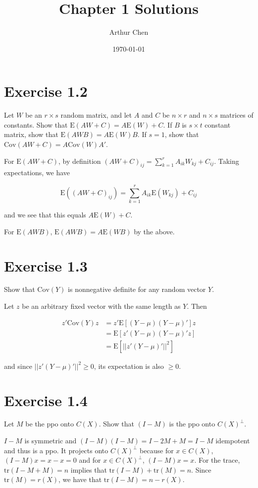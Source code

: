 \documentclass{article}
\author{Arthur Chen}
\title{Chapter 1 Solutions}
\date{\today}
\newcommand{\E}{\text{E}}
\newcommand{\cov}{\text{Cov}}
\newcommand{\tr}{\text{tr}}
\begin{document}
\maketitle

\section*{Exercise 1.2}

Let $W$ be an $r \times s$ random matrix, and let $A$ and $C$ be $n \times r$ and $n \times s$ matrices of constants. Show that $\E(AW+C) = A\E(W) + C$. If $B$ is $s \times t$ constant matrix, show that $\E(AWB) = A\E(W)B$. If $s=1$, show that $\cov(AW+C) = A\cov(W)A'$.

For $\E(AW+C)$, by definition $(AW+C)_{ij} = \sum_{k=1}^r A_{ik}W_{kj} + C_{ij}$. Taking expectations, we have

\[
\E((AW+C)_{ij}) = \sum_{k=1}^r A_{ik}\E(W_{kj}) + C_{ij}
\]

and we see that this equals $A\E(W)+C$.

For $\E(AWB)$, $\E(AWB) = A\E(WB)$ by the above.

\section*{Exercise 1.3}

Show that $\cov(Y)$ is nonnegative definite for any random vector $Y$.

Let $z$ be an arbitrary fixed vector with the same length as $Y$. Then

\begin{align*}
z'\cov(Y)z &= z'\E[(Y-\mu)(Y-\mu)']z \\
&= \E[z'(Y-\mu)(Y-\mu)'z] \\
&= \E[||z'(Y-\mu)'||^2]
\end{align*}

and since $||z'(Y-\mu)'||^2 \geq 0$, its expectation is also $\geq 0$.

\section*{Exercise 1.4}

Let $M$ be the ppo onto $C(X)$. Show that $(I-M)$ is the ppo onto $C(X)^\perp$.

$I-M$ is symmetric and $(I-M)(I-M) = I-2M+M = I-M$ idempotent and thus is a ppo. It projects onto $C(X)^\perp$ because for $x \in C(X)$, $(I-M)x = x-x=0$ and for $x \in C(X)^\perp$, $(I-M)x = x$. For the trace, $\tr(I-M+M) = n$ implies that $\tr(I-M)+\tr(M)=n$. Since $\tr(M)=r(X)$, we have that $\tr(I-M)=n-r(X)$.
\end{document}
